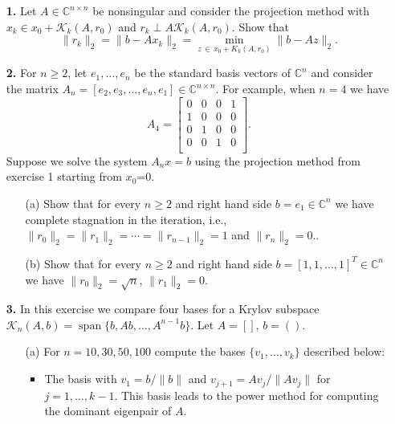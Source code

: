 \documentclass[10pt]{report}
\begin{document}
\begin{enumerate}
\item[\textbf{1.}] Let $A \in \mathbb{C}^{n \times n}$ be nonsingular and consider the projection method with $x_k \in x_0 + \mathcal{K}_k(A,r_0)$ and \linebreak $r_k \perp A \mathcal{K}_k(A,r_0)$. Show that \[\|r_{k}\|_2=\|b-Ax_k\|_2=\min_{z \,\in \, x_0+K_k(A,r_0)}\|b-Az\|_2.\]


\vspace{0.1cm} 

\item[\textbf{2.}] For $n \geq 2$, let  $e_1, \ldots, e_n$ be the standard basis vectors of $\mathbb{C}^n$ and consider the matrix 
$A_n=[e_2,e_3,\ldots ,e_n,e_1] \in \mathbb{C}^{n \times n}$. For example, when $n=4$ we have
\[  A_4 = \left[\begin{array}{cccc}
0 & 0 & 0 & 1 \\ 
1 & 0 & 0 & 0 \\
0 & 1 & 0 & 0 \\
0 & 0 & 1 & 0 \\
\end{array} \right].\]
Suppose we solve the system $A_nx=b$ using the projection method from exercise 1 starting from $x_0$=0.
\begin{itemize}
\item[(a)] Show that for every $n \geq 2$ and right hand side $b=e_1 \in \mathbb{C}^n$ we have complete stagnation in the iteration, i.e., $\|r_0\|_2 = \|r_1\|_2=\cdots =\|r_{n-1}\|_2=1$ and $\|r_n\|_2=0.$.
\item[(b)] Show that for every $n \geq 2$ and right hand side $b=[1, 1, \ldots, 1]^T \in \mathbb{C}^n$ we have $\|r_0\|_2=\sqrt{n}$, $\|r_1\|_2=0.$
\end{itemize}  

\item[\textbf{3.}] In this exercise we compare four bases for a Krylov subspace $\mathcal{K}_n(A,b)= \operatorname{span}\{b, Ab, \ldots, A^{n-1}b\}$. Let $A=[]$, $b=()$. 

\begin{itemize}
\item[(a)] For $n= 10, 30, 50, 100$ compute the bases $\{v_1, \ldots,v_k\}$ described below:
\begin{itemize}
\item The basis with $v_1=b/\|b\|$ and $v_{j+1}=Av_j/\|Av_j\|$ for $j=1, \ldots, k-1$. This basis leads to the power method for computing the dominant eigenpair of $A$.


\end{itemize}
\end{itemize}
\end{enumerate}
\end{document}
